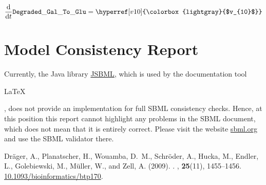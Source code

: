 \documentclass[11pt,twoside,bibtotoc,a4paper]{scrartcl}
\newcommand{\SBMLLaTeX}{{\sffamily\upshape\raisebox{-.35ex}{S\hspace{-.425ex}BML}\hspace{-0.5ex}\begin{rotate}{-17.5}\raisebox{-.1ex}{2}\end{rotate}\hspace{1ex}\LaTeX}}
\begin{document}
\begin{dmath}
\frac{\mathrm d}{\mathrm dt} \mathtt{Degraded\-\_Gal\-\_To\-\_Glu} = \hyperref[v10]{\colorbox{lightgray}{$v_{10}$}}
\end{dmath}

\appendix

\section{Model Consistency Report}
Currently, the Java\texttrademark{} library \href{http://jsbml.sourceforge.net}{JSBML}, which is used by the documentation tool \SBMLLaTeX, does not provide an implementation for full SBML consistency checks. Hence, at this position this report cannot highlight any problems in the SBML document, which does not mean that it is entirely correct. Please visit the website \href{http://sbml.org}{sbml.org} and use the SBML validator there.

\begin{thebibliography}{}
Dr\"ager, A., Planatscher, H., Wouamba, D.~M., Schr\"oder, A., Hucka, M.,
  Endler, L., Golebiewski, M., M{\"u}ller, W., and Zell, A. (2009).
.
, {\bf 25}(11), 1455--1456. \href{http://dx.doi.org/10.1093/bioinformatics/btp170}{10.1093/bioinformatics/btp170}.
\end{thebibliography}
\end{document}
